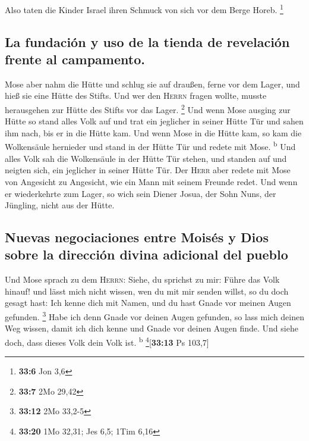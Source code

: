  Also taten die Kinder Israel ihren Schmuck von sich vor
dem Berge Horeb. \footnote{\textbf{33:6} Jon 3,6}

\hypertarget{la-fundaciuxf3n-y-uso-de-la-tienda-de-revelaciuxf3n-frente-al-campamento.}{%
\subsection{La fundación y uso de la tienda de revelación frente al
campamento.}\label{la-fundaciuxf3n-y-uso-de-la-tienda-de-revelaciuxf3n-frente-al-campamento.}}

 Mose aber nahm die Hütte und schlug sie auf draußen,
ferne vor dem Lager, und hieß sie eine Hütte des Stifts. Und wer den
\textsc{Herrn} fragen wollte, musste herausgehen zur Hütte des Stifts
vor das Lager. \footnote{\textbf{33:7} 2Mo 29,42}  Und
wenn Mose ausging zur Hütte so stand alles Volk auf und trat ein
jeglicher in seiner Hütte Tür und sahen ihm nach, bis er in die Hütte
kam.  Und wenn Mose in die Hütte kam, so kam die
Wolkensäule hernieder und stand in der Hütte Tür und redete mit Mose.
\textsuperscript{b}  Und alles Volk sah die Wolkensäule
in der Hütte Tür stehen, und standen auf und neigten sich, ein jeglicher
in seiner Hütte Tür.  Der \textsc{Herr} aber redete mit
Mose von Angesicht zu Angesicht, wie ein Mann mit seinem Freunde redet.
Und wenn er wiederkehrte zum Lager, so wich sein Diener Josua, der Sohn
Nuns, der Jüngling, nicht aus der Hütte.

\hypertarget{nuevas-negociaciones-entre-moisuxe9s-y-dios-sobre-la-direcciuxf3n-divina-adicional-del-pueblo}{%
\subsection{Nuevas negociaciones entre Moisés y Dios sobre la dirección
divina adicional del
pueblo}\label{nuevas-negociaciones-entre-moisuxe9s-y-dios-sobre-la-direcciuxf3n-divina-adicional-del-pueblo}}

 Und Mose sprach zu dem \textsc{Herrn}: Siehe, du
sprichst zu mir: Führe das Volk hinauf! und lässt mich nicht wissen, wen
du mit mir senden willst, so du doch gesagt hast: Ich kenne dich mit
Namen, und du hast Gnade vor meinen Augen gefunden. \footnote{\textbf{33:12}
  2Mo 33,2-5}  Habe ich denn Gnade vor deinen Augen
gefunden, so lass mich deinen Weg wissen, damit ich dich kenne und Gnade
vor deinen Augen finde. Und siehe doch, dass dieses Volk dein Volk ist.
\textsuperscript{b} \footnote{\textbf{33:20} 1Mo 32,31; Jes 6,5; 1Tim
  6,16}{[}\textbf{33:13} Ps 103,7{]}

